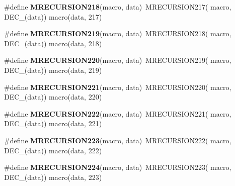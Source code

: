 \begin{DoxyCompactItemize}
\item 
\hypertarget{group__group__sam0__utils__mrecursion_ga0cd77c09c29f7703306e2baa29d6e6c2}{}\#define {\bfseries M\+R\+E\+C\+U\+R\+S\+I\+O\+N218}(macro,  data)~M\+R\+E\+C\+U\+R\+S\+I\+O\+N217(  macro, D\+E\+C\+\_\+(data))   macro(data, 217)\label{group__group__sam0__utils__mrecursion_ga0cd77c09c29f7703306e2baa29d6e6c2}

\item 
\hypertarget{group__group__sam0__utils__mrecursion_ga2a11a726d4daa1ad0ef13baafa4a12c1}{}\#define {\bfseries M\+R\+E\+C\+U\+R\+S\+I\+O\+N219}(macro,  data)~M\+R\+E\+C\+U\+R\+S\+I\+O\+N218(  macro, D\+E\+C\+\_\+(data))   macro(data, 218)\label{group__group__sam0__utils__mrecursion_ga2a11a726d4daa1ad0ef13baafa4a12c1}

\item 
\hypertarget{group__group__sam0__utils__mrecursion_gaf25d86aca809a1c7161e431090a6d7a2}{}\#define {\bfseries M\+R\+E\+C\+U\+R\+S\+I\+O\+N220}(macro,  data)~M\+R\+E\+C\+U\+R\+S\+I\+O\+N219(  macro, D\+E\+C\+\_\+(data))   macro(data, 219)\label{group__group__sam0__utils__mrecursion_gaf25d86aca809a1c7161e431090a6d7a2}

\item 
\hypertarget{group__group__sam0__utils__mrecursion_gab39c3f39c867806b04c6e4b5afe65fb8}{}\#define {\bfseries M\+R\+E\+C\+U\+R\+S\+I\+O\+N221}(macro,  data)~M\+R\+E\+C\+U\+R\+S\+I\+O\+N220(  macro, D\+E\+C\+\_\+(data))   macro(data, 220)\label{group__group__sam0__utils__mrecursion_gab39c3f39c867806b04c6e4b5afe65fb8}

\item 
\hypertarget{group__group__sam0__utils__mrecursion_gaa0d5577f93a6d507f684b144d77d3ada}{}\#define {\bfseries M\+R\+E\+C\+U\+R\+S\+I\+O\+N222}(macro,  data)~M\+R\+E\+C\+U\+R\+S\+I\+O\+N221(  macro, D\+E\+C\+\_\+(data))   macro(data, 221)\label{group__group__sam0__utils__mrecursion_gaa0d5577f93a6d507f684b144d77d3ada}

\item 
\hypertarget{group__group__sam0__utils__mrecursion_ga0ea3f60a2517a10616b7a00e57722636}{}\#define {\bfseries M\+R\+E\+C\+U\+R\+S\+I\+O\+N223}(macro,  data)~M\+R\+E\+C\+U\+R\+S\+I\+O\+N222(  macro, D\+E\+C\+\_\+(data))   macro(data, 222)\label{group__group__sam0__utils__mrecursion_ga0ea3f60a2517a10616b7a00e57722636}

\item 
\hypertarget{group__group__sam0__utils__mrecursion_ga5d2b86c40ce9218629a8c46d94f34206}{}\#define {\bfseries M\+R\+E\+C\+U\+R\+S\+I\+O\+N224}(macro,  data)~M\+R\+E\+C\+U\+R\+S\+I\+O\+N223(  macro, D\+E\+C\+\_\+(data))   macro(data, 223)\label{group__group__sam0__utils__mrecursion_ga5d2b86c40ce9218629a8c46d94f34206}


\end{DoxyCompactItemize}
